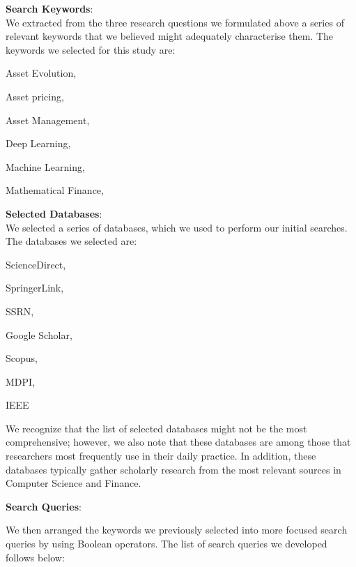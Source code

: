 \documentclass[11pt]{article}
\newenvironment{paraenum}{\begin{inparaenum}[\itshape a)\upshape]}{\end{inparaenum}}
\begin{document}
\textbf{Search Keywords}:\\
\label{S:searchKeywords}
We extracted from the three research questions we formulated above a series of relevant keywords that we believed might adequately characterise them. The keywords we selected for this study are: 
\begin{paraenum}
\item Asset Evolution,
\item Asset pricing,
\item Asset Management, 
\item Deep Learning,
\item Machine Learning,
\item Mathematical Finance,

\end{paraenum}

\textbf{Selected Databases}:\\ \label{S:searchResources}
We selected a series of databases, which we used to perform our initial searches. The databases we selected are:\begin{paraenum}\label{E:searchResources}
\item ScienceDirect,
\item SpringerLink,
\item SSRN,
\item Google Scholar,
\item Scopus,
\item MDPI,
\item IEEE
\end{paraenum}

We recognize that the list of selected databases might not be the most comprehensive; however, we also note that these databases are among those that researchers most frequently use in their daily practice. In addition, these databases typically gather scholarly research from the most relevant sources in Computer Science and Finance.

\textbf{Search Queries}:\label{S:searchQueries}

We then arranged the keywords we previously selected into more focused search queries by using Boolean operators. The list of search queries we developed follows below:
\end{document}
